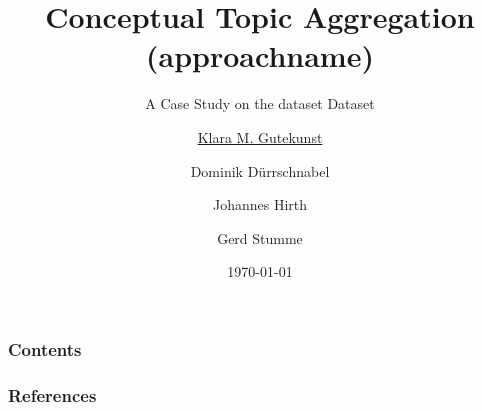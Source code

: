 \documentclass[10pt]{beamer}
\title[\university{}]{Conceptual Topic Aggregation (\acs{approachname})}
\subtitle{A Case Study on the \acs{dataset} Dataset}
\author[Klara M. Gutekunst]{\underline{Klara M. Gutekunst} \and Dominik Dürrschnabel \and Johannes Hirth \and Gerd Stumme}
\institute[klara.gutekunst@uni-kassel.de]{\university{}}
\date[\today]
{\today}
\begin{document}

\frame{\titlepage}
\begin{frame}
\frametitle{Contents}
\tableofcontents
\end{frame}


















\begin{frame}[allowframebreaks]
\frametitle{References}
\printbibliography
\end{frame} 
\end{document}
